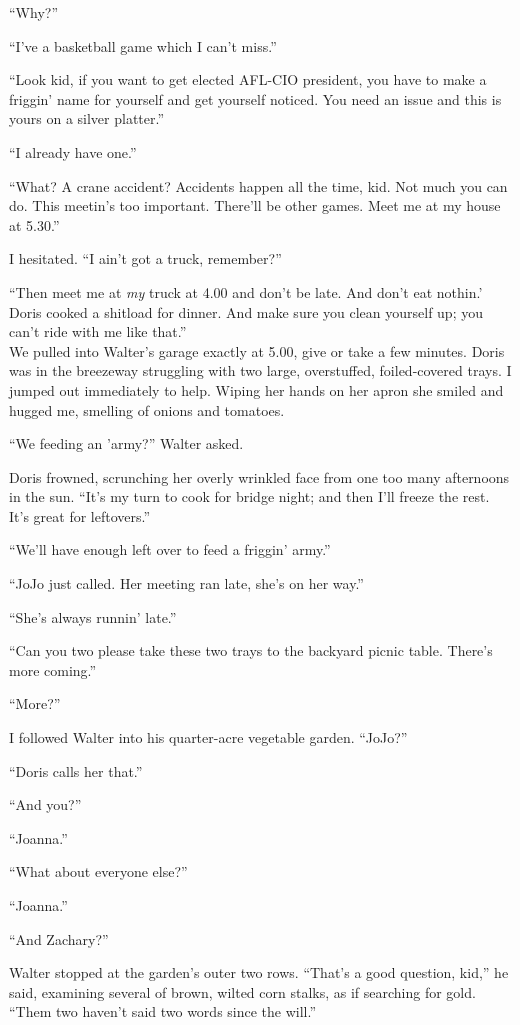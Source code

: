 ``Why?''

``I've a basketball game which I can't miss.''

``Look kid, if you want to get elected AFL-CIO president, you have to
make a friggin' name for yourself and get yourself noticed. You need an
issue and this is yours on a silver platter.''

``I already have one.''

``What? A crane accident? Accidents happen all the time, kid. Not much
you can do. This meetin's too important. There'll be other games. Meet
me at my house at 5.30.''

I hesitated. ``I ain't got a truck, remember?''

``Then meet me at \emph{my} truck at 4.00 and don't be late. And don't
eat nothin.' Doris cooked a shitload for dinner. And make sure you clean
yourself up; you can't ride with me like that.''\\

We pulled into Walter's garage exactly at 5.00, give or take a few
minutes. Doris was in the breezeway struggling with two large,
overstuffed, foiled-covered trays. I jumped out immediately to help.
Wiping her hands on her apron she smiled and hugged me, smelling of
onions and tomatoes.

``We feeding an 'army?'' Walter asked.

Doris frowned, scrunching her overly wrinkled face from one too many
afternoons in the sun. ``It's my turn to cook for bridge night; and then
I'll freeze the rest. It's great for leftovers.''

``We'll have enough left over to feed a friggin' army.''

``JoJo just called. Her meeting ran late, she's on her way.''

``She's always runnin' late.''

``Can you two please take these two trays to the backyard picnic table.
There's more coming.''

``More?''

I followed Walter into his quarter-acre vegetable garden. ``JoJo?''

``Doris calls her that.''

``And you?''

``Joanna.''

``What about everyone else?''

``Joanna.''

``And Zachary?''

Walter stopped at the garden's outer two rows. ``That's a good question,
kid,'' he said, examining several of brown, wilted corn stalks, as if
searching for gold. ``Them two haven't said two words since the will.''

